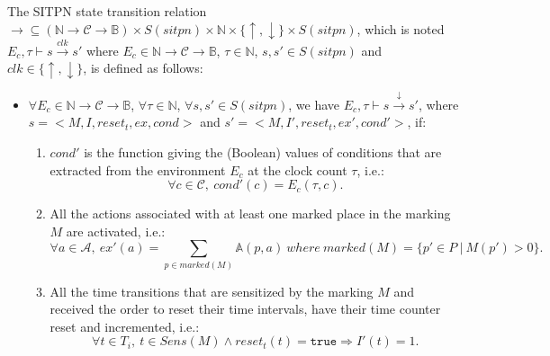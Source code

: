 \begin{definition}
  \label{def:semantics}
  The SITPN state transition relation
  $\rightarrow\subseteq{}(\mathbb{N}\rightarrow\mathcal{C}\rightarrow\mathbb{B})\times{}S(sitpn)\times{}\mathbb{N}\times{}\{\uparrow,\downarrow\}\times{}S(sitpn)$, which is noted\\
  $E_c,\tau\vdash{}s\xrightarrow{clk}s'$ where
  $E_c\in\mathbb{N}\rightarrow\mathcal{C}\rightarrow\mathbb{B}$,
  $\tau\in\mathbb{N}$, $s,s'\in{}S(sitpn)$ and
  $clk\in\{\uparrow,\downarrow\}$, is defined as follows:
  
  \begin{itemize}
  \item
    $\forall{}E_c\in\mathbb{N}\rightarrow\mathcal{C}\rightarrow\mathbb{B}$,
    $\forall\tau\in\mathbb{N}$, $\forall{}s,s'\in{}S(sitpn)$, we have
    $E_c,\tau\vdash{}s\xrightarrow{\downarrow}s'$, where
    $s=<M,I,reset_t,ex,cond>$ and $s'=<M,I',reset_t,ex',cond'>$, if:
    \begin{enumerate}[]
    \item\label{it:cond-env} $cond'$ is the function giving the
      (Boolean) values of conditions that are extracted from the
      environment $E_c$ at the clock count
      $\tau$, i.e.:
      \begin{equation*}
        \forall{}c\in{}\mathcal{C},~cond'(c)=E_c(\tau,c).
      \end{equation*}
      
    \item\label{it:activate-actions} All the actions associated
      with at least one
      marked place in the marking $M$ are activated, i.e.:
      \begin{equation*}
        \forall{}a\in{}\mathcal{A},~ex'(a)=\sum\limits_{p\in{}marked(M)}\mathbb{A}(p,a)
        ~where~marked(M)=\{p'\in{}P~\vert~M(p')>0\}.
      \end{equation*}
    \item\label{it:reset-counters} All the time transitions that are
      sensitized by the marking $M$ and received the order to reset
      their time intervals, have their time counter reset and
      incremented, i.e.:
      \begin{equation*}
        \forall{}t\in{}T_i,~t\in{}Sens(M)\land{}reset_t(t)=\mathtt{true}
        \Rightarrow{}I'(t)=1.
      \end{equation*}
      

\end{enumerate}
\end{itemize}
\end{definition}
